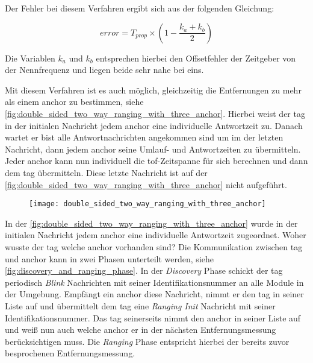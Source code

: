 Der Fehler bei diesem Verfahren ergibt sich aus der folgenden Gleichung:

\begin{equation}
error=T_{prop}\times\left(1-\frac{k_a+k_b}{2}\right)
\end{equation}

Die Variablen $k_a$ und $k_b$ entsprechen hierbei den Offsetfehler der Zeitgeber von der Nennfrequenz und liegen beide sehr nahe bei eins.

Mit diesem Verfahren ist es auch möglich, gleichzeitig die Entfernungen zu mehr als einem \Gls{anchor} zu bestimmen, siehe \autoref{fig:double_sided_two_way_ranging_with_three_anchor}. Hierbei weist der \Gls{tag} in der initialen Nachricht jedem \Gls{anchor} eine individuelle Antwortzeit zu. Danach wartet er bist alle Antwortnachrichten angekommen sind um im der letzten Nachricht, dann jedem \Gls{anchor} seine Umlauf- und Antwortzeiten zu übermitteln. Jeder \Gls{anchor} kann nun individuell die \Gls{tof}-Zeitspanne für sich berechnen und dann dem \Gls{tag} übermitteln. Diese letzte Nachricht ist auf der \autoref{fig:double_sided_two_way_ranging_with_three_anchor} nicht aufgeführt.

\begin{figure}
	\centering
	\texttt{[image: double\_sided\_two\_way\_ranging\_with\_three\_anchor]}
	\label{fig:double_sided_two_way_ranging_with_three_anchor}
\end{figure}

In der \autoref{fig:double_sided_two_way_ranging_with_three_anchor} wurde in der initialen Nachricht jedem \Gls{anchor} eine individuelle Antwortzeit zugeordnet. Woher wusste der \Gls{tag} welche \Gls{anchor} vorhanden sind? Die Kommunikation zwischen \Gls{tag} und \Gls{anchor} kann in zwei Phasen unterteilt werden, siehe \autoref{fig:discovery_and_ranging_phase}. In der \textit{Discovery} Phase schickt der \Gls{tag} periodisch \textit{Blink} Nachrichten mit seiner Identifikationsnummer an alle Module in der Umgebung. Empfängt ein \Gls{anchor} diese Nachricht, nimmt er den \Gls{tag} in seiner Liste auf und übermittelt dem \Gls{tag} eine \textit{Ranging Init} Nachricht mit seiner Identifikationsnummer. Das \Gls{tag} seinerseits nimmt den \Gls{anchor} in seiner Liste auf und weiß nun auch welche \Gls{anchor} er in der nächsten Entfernungsmessung berücksichtigen muss. Die \textit{Ranging} Phase entspricht hierbei der bereits zuvor besprochenen Entfernungsmessung.

